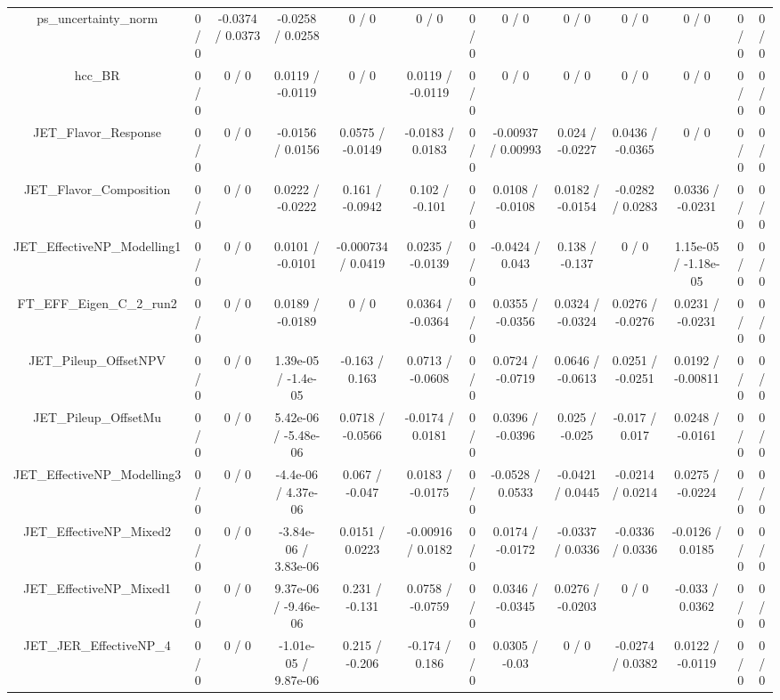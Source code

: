 \documentclass[10pt]{article}
\begin{document}
\begin{table}[htbp]
\begin{center}
\begin{tabular}{|c|c|c|c|c|c|c|c|c|c|c|c|c|}
  ps_uncertainty_norm & 0 / 0 & -0.0374 / 0.0373 & -0.0258 / 0.0258 & 0 / 0 & 0 / 0 & 0 / 0 & 0 / 0 & 0 / 0 & 0 / 0 & 0 / 0 & 0 / 0 & 0 / 0 \\ 
  hcc_BR & 0 / 0 & 0 / 0 & 0.0119 / -0.0119 & 0 / 0 & 0.0119 / -0.0119 & 0 / 0 & 0 / 0 & 0 / 0 & 0 / 0 & 0 / 0 & 0 / 0 & 0 / 0 \\ 
  JET_Flavor_Response & 0 / 0 & 0 / 0 & -0.0156 / 0.0156 & 0.0575 / -0.0149 & -0.0183 / 0.0183 & 0 / 0 & -0.00937 / 0.00993 & 0.024 / -0.0227 & 0.0436 / -0.0365 & 0 / 0 & 0 / 0 & 0 / 0 \\ 
  JET_Flavor_Composition & 0 / 0 & 0 / 0 & 0.0222 / -0.0222 & 0.161 / -0.0942 & 0.102 / -0.101 & 0 / 0 & 0.0108 / -0.0108 & 0.0182 / -0.0154 & -0.0282 / 0.0283 & 0.0336 / -0.0231 & 0 / 0 & 0 / 0 \\ 
  JET_EffectiveNP_Modelling1 & 0 / 0 & 0 / 0 & 0.0101 / -0.0101 & -0.000734 / 0.0419 & 0.0235 / -0.0139 & 0 / 0 & -0.0424 / 0.043 & 0.138 / -0.137 & 0 / 0 & 1.15e-05 / -1.18e-05 & 0 / 0 & 0 / 0 \\ 
  FT_EFF_Eigen_C_2_run2 & 0 / 0 & 0 / 0 & 0.0189 / -0.0189 & 0 / 0 & 0.0364 / -0.0364 & 0 / 0 & 0.0355 / -0.0356 & 0.0324 / -0.0324 & 0.0276 / -0.0276 & 0.0231 / -0.0231 & 0 / 0 & 0 / 0 \\ 
  JET_Pileup_OffsetNPV & 0 / 0 & 0 / 0 & 1.39e-05 / -1.4e-05 & -0.163 / 0.163 & 0.0713 / -0.0608 & 0 / 0 & 0.0724 / -0.0719 & 0.0646 / -0.0613 & 0.0251 / -0.0251 & 0.0192 / -0.00811 & 0 / 0 & 0 / 0 \\ 
  JET_Pileup_OffsetMu & 0 / 0 & 0 / 0 & 5.42e-06 / -5.48e-06 & 0.0718 / -0.0566 & -0.0174 / 0.0181 & 0 / 0 & 0.0396 / -0.0396 & 0.025 / -0.025 & -0.017 / 0.017 & 0.0248 / -0.0161 & 0 / 0 & 0 / 0 \\ 
  JET_EffectiveNP_Modelling3 & 0 / 0 & 0 / 0 & -4.4e-06 / 4.37e-06 & 0.067 / -0.047 & 0.0183 / -0.0175 & 0 / 0 & -0.0528 / 0.0533 & -0.0421 / 0.0445 & -0.0214 / 0.0214 & 0.0275 / -0.0224 & 0 / 0 & 0 / 0 \\ 
  JET_EffectiveNP_Mixed2 & 0 / 0 & 0 / 0 & -3.84e-06 / 3.83e-06 & 0.0151 / 0.0223 & -0.00916 / 0.0182 & 0 / 0 & 0.0174 / -0.0172 & -0.0337 / 0.0336 & -0.0336 / 0.0336 & -0.0126 / 0.0185 & 0 / 0 & 0 / 0 \\ 
  JET_EffectiveNP_Mixed1 & 0 / 0 & 0 / 0 & 9.37e-06 / -9.46e-06 & 0.231 / -0.131 & 0.0758 / -0.0759 & 0 / 0 & 0.0346 / -0.0345 & 0.0276 / -0.0203 & 0 / 0 & -0.033 / 0.0362 & 0 / 0 & 0 / 0 \\ 
  JET_JER_EffectiveNP_4 & 0 / 0 & 0 / 0 & -1.01e-05 / 9.87e-06 & 0.215 / -0.206 & -0.174 / 0.186 & 0 / 0 & 0.0305 / -0.03 & 0 / 0 & -0.0274 / 0.0382 & 0.0122 / -0.0119 & 0 / 0 & 0 / 0 \\ 

\end{tabular}
\end{center}
\end{table}
\end{document}

